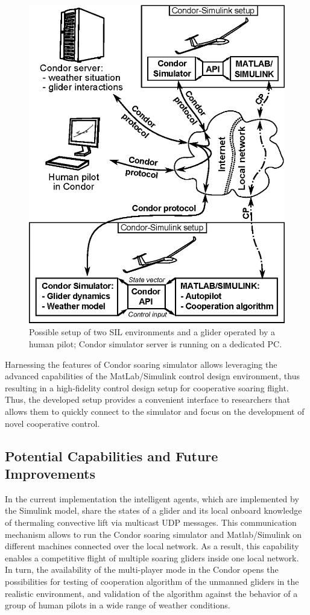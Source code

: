 \documentclass[letterpaper, 10 pt, conference]{ieeeconf}  %
\newcommand{\squeezeup}{\vspace{-1.0mm}}
\begin{document}
\begin{figure}[thpb]
  \centering
  \includegraphics[scale=0.45]{Figures/dev_env_.eps}
  \caption{Possible setup of two SIL environments and a glider operated by a human pilot; Condor simulator server is running on a dedicated PC.}
  \label{fig:DevEnv}
\end{figure}

Harnessing the features of Condor soaring simulator allows leveraging the advanced capabilities of the MatLab/Simulink control design environment, thus resulting in a high-fidelity control design setup for cooperative soaring flight. Thus, the developed setup provides a convenient interface to researchers that allows them to quickly connect to the simulator and focus on the development of novel cooperative control.

\subsection{Potential Capabilities and Future Improvements}
\squeezeup
In the current implementation the intelligent agents, which are implemented by the Simulink model, share the states of a glider and its local onboard knowledge of thermaling convective lift via multicast UDP messages. This communication mechanism allows to run the Condor soaring simulator and Matlab/Simulink on different machines connected over the local network. As a result, this capability enables a competitive flight of multiple soaring gliders inside one local network. In turn, the availability of the multi-player mode in the Condor opens the possibilities for testing of cooperation algorithm of the unmanned gliders in the realistic environment, and validation of the algorithm against the behavior of a group of human pilots in a wide range of weather conditions.
\end{document}
